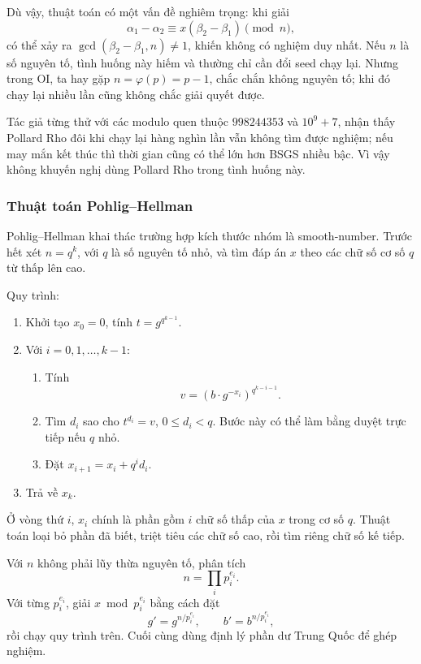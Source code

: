 \documentclass[11pt]{article}
\begin{document}
Dù vậy, thuật toán có một vấn đề nghiêm trọng: khi giải
\[
  \alpha_1-\alpha_2\equiv x(\beta_2-\beta_1)\pmod n,
\]
có thể xảy ra \(\gcd(\beta_2-\beta_1,n)\ne 1\), khiến không có nghiệm duy nhất.
Nếu \(n\) là số nguyên tố, tình huống này hiếm và thường chỉ cần đổi seed chạy
lại. Nhưng trong OI, ta hay gặp \(n=\varphi(p)=p-1\), chắc chắn không nguyên
tố; khi đó chạy lại nhiều lần cũng không chắc giải quyết được.

Tác giả từng thử với các modulo quen thuộc \(998244353\) và \(10^9+7\), nhận
thấy Pollard Rho đôi khi chạy lại hàng nghìn lần vẫn không tìm được nghiệm;
nếu may mắn kết thúc thì thời gian cũng có thể lớn hơn BSGS nhiều bậc. Vì vậy
không khuyến nghị dùng Pollard Rho trong tình huống này.

\subsubsection{Thuật toán Pohlig--Hellman}

Pohlig--Hellman khai thác trường hợp kích thước nhóm là smooth-number. Trước
hết xét \(n=q^k\), với \(q\) là số nguyên tố nhỏ, và tìm đáp án \(x\) theo các
chữ số cơ số \(q\) từ thấp lên cao.

Quy trình:
\begin{enumerate}
  \item Khởi tạo \(x_0=0\), tính \(t=g^{q^{k-1}}\).
  \item Với \(i=0,1,\ldots,k-1\):
  \begin{enumerate}
    \item Tính
    \[
      v=(b\cdot g^{-x_i})^{q^{k-i-1}}.
    \]
    \item Tìm \(d_i\) sao cho \(t^{d_i}=v\), \(0\le d_i<q\). Bước này có thể
    làm bằng duyệt trực tiếp nếu \(q\) nhỏ.
    \item Đặt \(x_{i+1}=x_i+q^i d_i\).
  \end{enumerate}
  \item Trả về \(x_k\).
\end{enumerate}

Ở vòng thứ \(i\), \(x_i\) chính là phần gồm \(i\) chữ số thấp của \(x\) trong
cơ số \(q\). Thuật toán loại bỏ phần đã biết, triệt tiêu các chữ số cao, rồi
tìm riêng chữ số kế tiếp.

Với \(n\) không phải lũy thừa nguyên tố, phân tích
\[
  n=\prod_i p_i^{e_i}.
\]
Với từng \(p_i^{e_i}\), giải \(x\bmod p_i^{e_i}\) bằng cách đặt
\[
  g'=g^{n/p_i^{e_i}},\qquad b'=b^{n/p_i^{e_i}},
\]
rồi chạy quy trình trên. Cuối cùng dùng định lý phần dư Trung Quốc để ghép
nghiệm.
\end{document}
